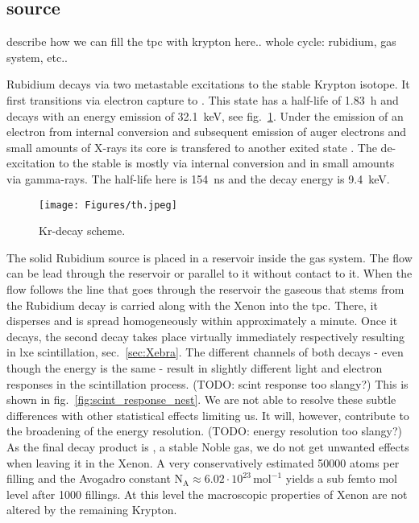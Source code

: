 
\FloatBarrier
\subsection{source}
\label{ssec:source}
\FloatBarrier


describe how we can fill the tpc with krypton here.. whole cycle: rubidium, gas system, etc..


Rubidium  decays via two metastable excitations to the stable  Krypton isotope.
It first transitions via electron capture to .
This state has a half-life of \SI{1.83}{\hour} and decays with an energy emission of \SI{32.1}{\kilo\electronvolt}, see fig.~\ref{fig:scheme_kr}.
Under the emission of an electron from internal conversion and subsequent emission of auger electrons and small amounts of X-rays its core is transfered to another exited state .
The de-excitation to the stable  is mostly via internal conversion and in small amounts via gamma-rays.
The half-life here is \SI{154}{\nano\s} and the decay energy is \SI{9.4}{\kilo\electronvolt}.


\begin{figure}
    \centering
    \texttt{[image: Figures/th.jpeg]}  %
    \caption[Decay Scheme Krypton]{Kr-decay scheme\cite{kr_scheme}.}
    \label{fig:scheme_kr}
\end{figure}

The solid Rubidium source is placed in a reservoir inside the gas system.
The flow can be lead through the reservoir or parallel to it without contact to it.
When the flow follows the line that goes through the reservoir the gaseous  that stems from the Rubidium decay is carried along with the Xenon into the \gls{tpc}.
There, it disperses and is spread homogeneously within approximately a minute.
Once it decays, the second decay takes place virtually immediately respectively resulting in \gls{lxe} scintillation, sec.~\ref{sec:Xebra}.
The different channels of both decays - even though the energy is the same - result in slightly different light and electron responses in the scintillation process. (TODO: scint response too slangy?)
This is shown in fig.~\ref{fig:scint_response_nest}.
We are not able to resolve these subtle differences with other statistical effects limiting us.
It will, however, contribute to the broadening of the energy resolution. (TODO: energy resolution too slangy?)
As the final decay product is , a stable Noble gas, we do not get unwanted effects when leaving it in the Xenon.
A very conservatively estimated \SI{50000}{} atoms per filling and the Avogadro constant $ \mathrm{N}_\mathrm{A} \approx 6.02\cdot10^{23}\,\mathrm{mol}^{-1} $ yields a sub femto mol level after 1000 fillings.
At this level the macroscopic properties of Xenon are not altered by the remaining Krypton.


